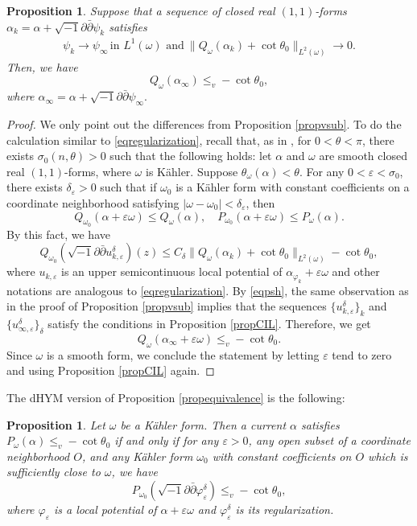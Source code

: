 \documentclass{amsart}
\numberwithin{equation}{section}
\theoremstyle{plain}
\newtheorem{prop}[equation]{Proposition}
\theoremstyle{definition}
\theoremstyle{remark}
\newcommand{\delb}{\sqrt{-1}\partial\bar{\partial}}
\begin{document}
\begin{prop}\label{propdhymvsub}
    Suppose that a sequence of closed real $(1,1)$-forms $\alpha_k=\alpha+\delb \psi_k$ satisfies
    \begin{align*}
        \psi_k \rightarrow \psi_\infty \, \text{in $L^1(\omega)$ and} \ 
        \|Q_\omega(\alpha_k)+\cot{\theta_0}\|_{L^2(\omega)} \rightarrow 0.    
    \end{align*}    
    Then, we have
    $$Q_\omega(\alpha_\infty)\le_v -\cot{\theta_0},$$
    where $\alpha_\infty=\alpha+\delb \psi_\infty.$
\end{prop}

\begin{proof}
    We only point out the differences from Proposition \ref{propvsub}. To do the calculation similar to \eqref{eqregularization}, recall that, as in \cite[Lemma 5.1]{CL}, for $0<\theta<\pi$, there exists $\sigma_0(n,\theta)>0$ such that the following holds: let $\alpha$ and $\omega$ are smooth closed real $(1,1)$-forms, where $\omega$ is K{\"a}hler. Suppose $\theta_\omega(\alpha)<\theta$. For any $0<\varepsilon<\sigma_0$, there exists $\delta_\varepsilon>0$ such that if $\omega_0$ is a K{\"a}hler form with constant coefficients on a coordinate neighborhood satisfying $ |\omega-\omega_0|<\delta_\varepsilon$, then
    $$Q_{\omega_0}(\alpha+\varepsilon\omega)\le Q_\omega(\alpha),\quad P_{\omega_0}(\alpha+\varepsilon\omega)\le P_\omega(\alpha).$$
    By this fact, we have
    $$Q_{\omega_0}(\delb u_{k,\varepsilon}^\delta)(z)\le C_\delta\|Q_\omega(\alpha_k)+\cot{\theta_0}\|_{L^2(\omega)}-\cot{\theta_0},$$
    where $u_{k,\varepsilon}$ is an upper semicontinuous local potential of $\alpha_{\varphi_k}+\varepsilon\omega$ and other notations are analogous to \eqref{eqregularization}. By \eqref{eqpsh}, the same observation as in the proof of Proposition \ref{propvsub} implies that the sequences $\{u^\delta_{k,\varepsilon}\}_k$ and $\{u^\delta_{\infty,\varepsilon}\}_\delta$ satisfy the conditions in Proposition \ref{propCIL}. Therefore, we get
    $$Q_\omega(\alpha_\infty+\varepsilon\omega)\le_v -\cot{\theta_0}.$$
    Since $\omega$ is a smooth form, we conclude the statement by letting $\varepsilon$ tend to zero and using Proposition \ref{propCIL} again.
\end{proof}

The dHYM version of Proposition \ref{propequivalence} is the following:
\begin{prop}\label{propdhymequivalence}
    Let $\omega$ be a K{\"a}hler form. Then a current $\alpha$ satisfies $P_\omega(\alpha)\le_v -\cot{\theta_0}$ if and only if for any $\varepsilon>0$, any open subset of a coordinate neighborhood $O$, and any K{\"a}hler form $\omega_0$ with constant coefficients on $O$ which is sufficiently close to $\omega$, we have
    $$P_{\omega_0}(\delb \varphi^\delta_\varepsilon)\le_v -\cot{\theta_0},$$
    where $\varphi_\varepsilon$ is a local potential of $\alpha+\varepsilon\omega$ and $\varphi^\delta_\varepsilon$ is its regularization.
\end{prop}
\end{document}

